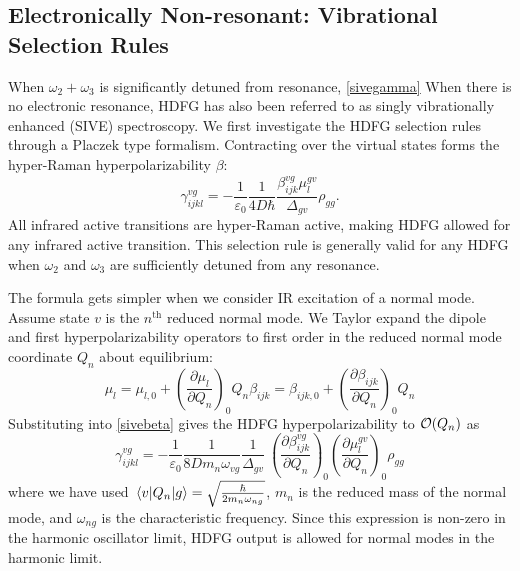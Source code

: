 \documentclass[aip, jcp, reprint, onecolumn]{revtex4-2}
\begin{document}
\subsection{Electronically Non-resonant: Vibrational Selection Rules}
When $\omega_2+\omega_3$ is significantly detuned from resonance,\cite{Placzek1934, Long1970, Altmann1982} \autoref{sivegamma} 
When there is no electronic resonance, HDFG has also been referred to as singly vibrationally enhanced (SIVE) spectroscopy. \cite{RN352}
We first investigate the HDFG selection rules through a Placzek type formalism.
Contracting over the virtual states forms the hyper-Raman hyperpolarizability $\beta$:\cite{Long1970} 
\begin{equation}\label{sivebeta}
	\gamma_{ijkl}^{vg} =	-\frac{1}{\varepsilon_0} \frac{1}{4D \hbar}\frac{\beta^{vg}_{ijk} \mu^{gv}_{l}}{\Delta_{gv}} \rho_{gg}.
\end{equation}
All infrared active transitions are hyper-Raman active, making HDFG allowed for any infrared active transition. \cite{Andrews1978}
This selection rule is generally valid for any HDFG when $\omega_2$ and $\omega_3$ are sufficiently detuned from any resonance.

The formula gets simpler when we consider IR excitation of a normal mode.  
Assume state $v$ is the $n^{\text{th}}$ reduced normal mode.
We Taylor expand the dipole and first hyperpolarizability operators to first order in the reduced normal mode coordinate $Q_n$ about equilibrium:\cite{Long1970, Shen90}
\begin{subequations}
	\begin{equation}
		\mu_l = \mu_{l,0} + \left(\frac{\partial \mu_l}{\partial Q_n}\right)_0 Q_n 
	\end{equation}
	\begin{equation}
		\beta_{ijk} = \beta_{ijk,0} + \left(\frac{\partial \beta_{ijk}}{\partial Q_n}\right)_0 Q_n
	\end{equation}
\end{subequations}
Substituting into \autoref{sivebeta} gives the HDFG hyperpolarizability to $\order{Q_n}$ as \begin{equation}\label{SIVEselection}
	\gamma_{ijkl}^{vg} =	-\frac{1}{\varepsilon_0} \frac{1}{8D m_n \omega_{vg}}  \frac{1}{{\Delta_{gv}}} \ \left(\frac{\partial \beta^{vg}_{ijk}}{\partial Q_n}\right)_0 \left({\frac{\partial \mu^{gv}_{l}}{\partial Q_n}}\right)_0  \rho_{gg}
\end{equation}
where we have used $\mel{v}{Q_n}{g} = \sqrt{\frac{\hbar}{2m_n\omega_{ng}}}$, $m_n$ is the reduced mass of the normal mode, and $\omega_{ng}$ is the characteristic frequency.\cite{RN230}
Since this expression is non-zero in the harmonic oscillator limit, HDFG output is allowed for normal modes in the harmonic limit. 
\end{document}
